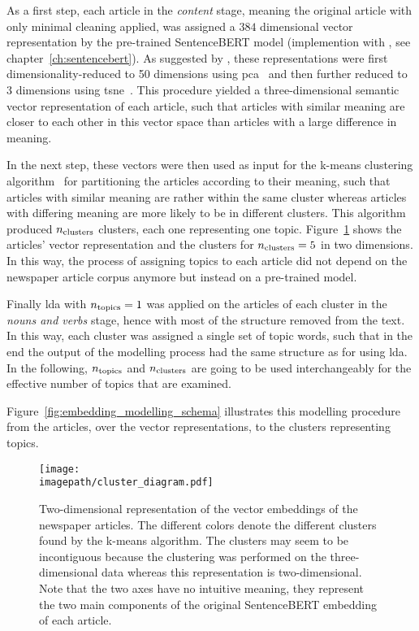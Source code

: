 As a first step, each article in the \textit{content} stage, meaning the original article with only minimal cleaning applied, was assigned a $384$ dimensional vector representation by the pre-trained SentenceBERT model (implemention with \textcite{sbertsentencetransformers_sentencetransformers_nodate}, see chapter~\ref{ch:sentencebert}). As suggested by \textcite{black_using_2020}, these representations were first dimensionality-reduced to \SI{50}{} dimensions using \gls{pca}~\autocite{pearson_liii_1901} and then further reduced to \SI{3}{} dimensions using \gls{tsne}~\autocite{maaten_visualizing_2008}. This procedure yielded a three-dimensional semantic vector representation of each article, such that articles with similar meaning are closer to each other in this vector space than articles with a large difference in meaning.

In the next step, these vectors were then used as input for the k-means clustering algorithm~\autocite{macqueen_methods_1967} for partitioning the articles according to their meaning, such that articles with similar meaning are rather within the same cluster whereas articles with differing meaning are more likely to be in different clusters. This algorithm produced $n_\text{clusters}$ clusters, each one representing one topic. Figure~\ref{fig:clusters} shows the articles' vector representation and the clusters for $n_\text{clusters}=5$ in two dimensions. In this way, the process of assigning topics to each article did not depend on the newspaper article corpus anymore but instead on a pre-trained model.

Finally \gls{lda} with $n_\text{topics}=1$ was applied on the articles of each cluster in the \textit{nouns and verbs} stage, hence with most of the structure removed from the text. In this way, each cluster was assigned a single set of topic words, such that in the end the output of the modelling process had the same structure as for using \gls{lda}. In the following, $n_\text{topics}$ and $n_\text{clusters}$ are going to be used interchangeably for the effective number of topics that are examined.

Figure~\ref{fig:embedding_modelling_schema} illustrates this modelling procedure from the articles, over the vector representations, to the clusters representing topics.

\begin{figure}
    \centering
    \texttt{[image: \\imagepath/cluster\_diagram.pdf]}
    \caption{Two-dimensional representation of the vector embeddings of the newspaper articles. The different colors denote the different clusters found by the k-means algorithm. The clusters may seem to be incontiguous because the clustering was performed on the three-dimensional data whereas this representation is two-dimensional. Note that the two axes have no intuitive meaning, they represent the two main components of the original SentenceBERT embedding of each article.}\label{fig:clusters}
\end{figure}

